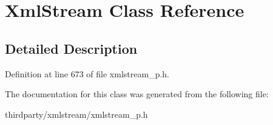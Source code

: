 \hypertarget{class_xml_stream}{}\section{Xml\+Stream Class Reference}
\label{class_xml_stream}


\subsection{Detailed Description}


Definition at line 673 of file xmlstream\+\_\+p.\+h.



The documentation for this class was generated from the following file\+:\begin{DoxyCompactItemize}
\item 
thirdparty/xmlstream/xmlstream\+\_\+p.\+h\end{DoxyCompactItemize}
